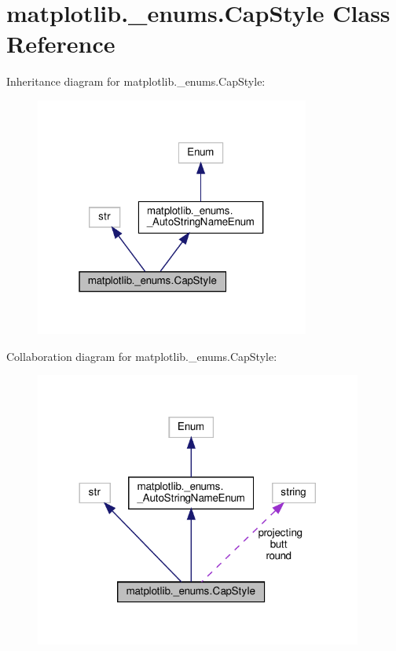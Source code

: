 \hypertarget{classmatplotlib_1_1__enums_1_1CapStyle}{}\section{matplotlib.\+\_\+enums.\+Cap\+Style Class Reference}
\label{classmatplotlib_1_1__enums_1_1CapStyle}


Inheritance diagram for matplotlib.\+\_\+enums.\+Cap\+Style\+:
\nopagebreak
\begin{figure}[H]
\begin{center}
\leavevmode
\includegraphics[width=256pt]{classmatplotlib_1_1__enums_1_1CapStyle__inherit__graph}
\end{center}
\end{figure}


Collaboration diagram for matplotlib.\+\_\+enums.\+Cap\+Style\+:
\nopagebreak
\begin{figure}[H]
\begin{center}
\leavevmode
\includegraphics[width=305pt]{classmatplotlib_1_1__enums_1_1CapStyle__coll__graph}
\end{center}
\end{figure}
